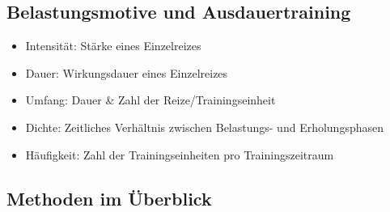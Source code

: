 \subsection{Belastungsmotive und Ausdauertraining}
\begin{itemize}
  \item Intensität: Stärke eines Einzelreizes
  \item Dauer: Wirkungsdauer eines Einzelreizes
  \item Umfang: Dauer \& Zahl der Reize/Trainingseinheit
  \item Dichte: Zeitliches Verhältnis zwischen Belastungs- und Erholungsphasen
  \item Häufigkeit: Zahl der Trainingseinheiten pro Trainingszeitraum
\end{itemize}

\subsection{Methoden im Überblick}
